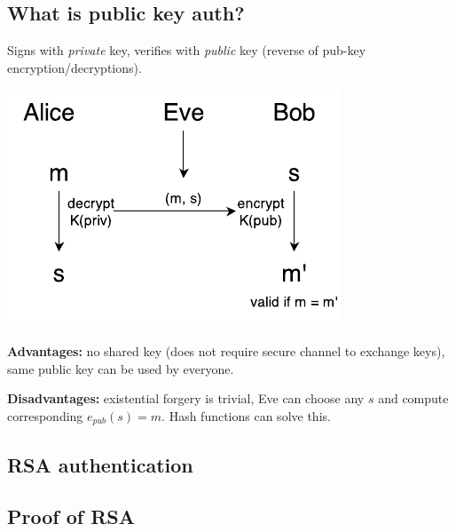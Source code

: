 \subsection{What is public key auth?}
Signs with \emph{private} key, verifies with \emph{public} key (reverse of pub-key encryption/decryptions).

\begin{center}
\includegraphics{images/2-pub-AB.pdf}
\end{center}

\textbf{Advantages:} no shared key (does not require secure channel to exchange keys), same public key can be used by everyone.

\textbf{Disadvantages:} existential forgery is trivial, Eve can choose any $s$ and compute corresponding $e_{pub}(s) = m$. Hash functions can solve this.

\subsection{RSA authentication}


\subsection{Proof of RSA}
